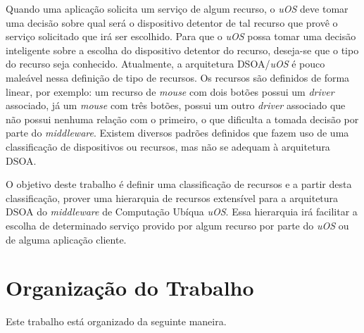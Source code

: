 Quando uma aplicação solicita um serviço de algum recurso, o \emph{uOS} deve tomar uma decisão sobre qual será o dispositivo detentor de tal recurso que provê o serviço solicitado que irá ser escolhido. Para que o \emph{uOS} possa tomar uma decisão inteligente sobre a escolha do dispositivo detentor do recurso, deseja-se que o tipo do recurso seja conhecido. Atualmente, a arquitetura DSOA/\emph{uOS} é pouco maleável nessa definição de tipo de recursos. Os recursos são definidos de forma linear, por exemplo: um recurso de \emph{mouse} com dois botões possui um \emph{driver} associado, já um \emph{mouse} com três botões, possui um outro \emph{driver} associado que não possui nenhuma relação com o primeiro, o que dificulta a tomada decisão por parte do \emph{middleware}. Existem diversos padrões definidos que fazem uso de uma classificação de dispositivos ou recursos, mas não se adequam à arquitetura DSOA.

O objetivo deste trabalho é definir uma classificação de recursos e a partir desta classificação, prover uma hierarquia de recursos extensível para a arquitetura DSOA do \emph{middleware} de Computação Ubíqua \emph{uOS}. Essa hierarquia irá facilitar a escolha de determinado serviço provido por algum recurso por parte do \emph{uOS} ou de alguma aplicação cliente.

\section{Organização do Trabalho}
Este trabalho está organizado da seguinte maneira.